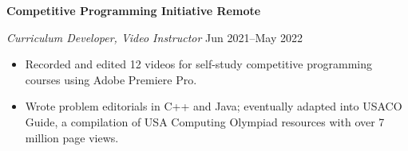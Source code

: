 \textbf{Competitive Programming Initiative \hfill Remote}\par
\textit{Curriculum Developer, Video Instructor} \hfill Jun 2021--May 2022

\begin{itemize}
	\item Recorded and edited 12 videos for self-study competitive programming courses using Adobe Premiere Pro.
    \item Wrote problem editorials in C++ and Java; eventually adapted into USACO Guide, a compilation of USA Computing Olympiad resources with over 7 million page views.
\end{itemize}\par